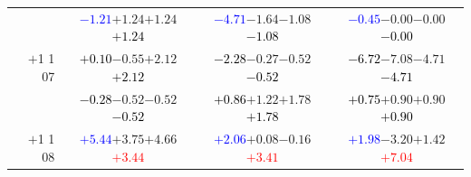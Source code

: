 \documentclass[compress]{beamer}
\begin{document}
\begin{frame}
\begin{tabular}{r | c | c | c}
          & \textcolor{blue}{$-1.21$}\hspace{0.1 cm}$+1.24$\hspace{0.1 cm}$+1.24$\hspace{0.1 cm}\textcolor{black}{$+1.24$} & \textcolor{blue}{$-4.71$}\hspace{0.1 cm}$-1.64$\hspace{0.1 cm}$-1.08$\hspace{0.1 cm}\textcolor{black}{$-1.08$} & \textcolor{blue}{$-0.45$}\hspace{0.1 cm}$-0.00$\hspace{0.1 cm}$-0.00$\hspace{0.1 cm}\textcolor{black}{$-0.00$} \\
$+$1 1 07 & \textcolor{black}{$+0.10$}\hspace{0.1 cm}$-0.55$\hspace{0.1 cm}$+2.12$\hspace{0.1 cm}\textcolor{black}{$+2.12$} & \textcolor{black}{$-2.28$}\hspace{0.1 cm}$-0.27$\hspace{0.1 cm}$-0.52$\hspace{0.1 cm}\textcolor{black}{$-0.52$} & \textcolor{black}{$-6.72$}\hspace{0.1 cm}$-7.08$\hspace{0.1 cm}$-4.71$\hspace{0.1 cm}\textcolor{black}{$-4.71$} \\
          & \textcolor{black}{$-0.28$}\hspace{0.1 cm}$-0.52$\hspace{0.1 cm}$-0.52$\hspace{0.1 cm}\textcolor{black}{$-0.52$} & \textcolor{black}{$+0.86$}\hspace{0.1 cm}$+1.22$\hspace{0.1 cm}$+1.78$\hspace{0.1 cm}\textcolor{black}{$+1.78$} & \textcolor{black}{$+0.75$}\hspace{0.1 cm}$+0.90$\hspace{0.1 cm}$+0.90$\hspace{0.1 cm}\textcolor{black}{$+0.90$} \\
$+$1 1 08 & \textcolor{blue}{$+5.44$}\hspace{0.1 cm}$+3.75$\hspace{0.1 cm}$+4.66$\hspace{0.1 cm}\textcolor{red}{$+3.44$} & \textcolor{blue}{$+2.06$}\hspace{0.1 cm}$+0.08$\hspace{0.1 cm}$-0.16$\hspace{0.1 cm}\textcolor{red}{$+3.41$} & \textcolor{blue}{$+1.98$}\hspace{0.1 cm}$-3.20$\hspace{0.1 cm}$+1.42$\hspace{0.1 cm}\textcolor{red}{$+7.04$} \\

\end{tabular}
\end{frame}
\end{document}
